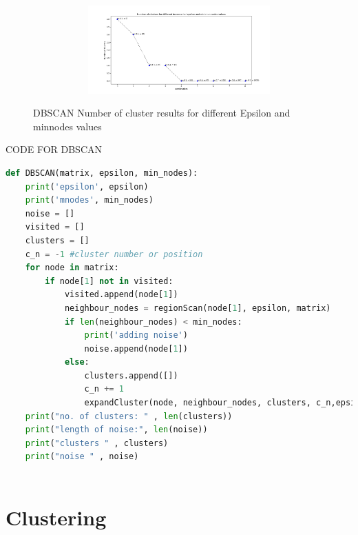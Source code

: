 \documentclass{article}
\begin{document}
\begin{figure}[H]
\begin{subfigure}{1\textwidth}
\begin{subfigure}{.5\textwidth}
            \caption{}
        \end{subfigure}
        \begin{subfigure}{.5\textwidth} 
            \centering  
            \includegraphics[width=1\linewidth]{./img/inc.png}
            \caption{}
        \end{subfigure}                
    \end{subfigure}
    \caption{DBSCAN Number of cluster results for different Epsilon and minnodes values}
    \label{fig:dbresults}
\end{figure}

CODE FOR DBSCAN
\begin{lstlisting}[language=Python, caption= DBSCAN Algorithm, label={lst:DBSCAN implementation}]
def DBSCAN(matrix, epsilon, min_nodes):
    print('epsilon', epsilon)
    print('mnodes', min_nodes)
    noise = []
    visited = []
    clusters = []
    c_n = -1 #cluster number or position
    for node in matrix:
        if node[1] not in visited:
            visited.append(node[1])
            neighbour_nodes = regionScan(node[1], epsilon, matrix)
            if len(neighbour_nodes) < min_nodes:
                print('adding noise')
                noise.append(node[1])
            else:
                clusters.append([])
                c_n += 1
                expandCluster(node, neighbour_nodes, clusters, c_n,epsilon, min_nodes, matrix, visited)
    print("no. of clusters: " , len(clusters))
    print("length of noise:", len(noise))
    print("clusters " , clusters)
    print("noise " , noise)
            
            \end{lstlisting}

        \section{Clustering}
        
\end{document}
